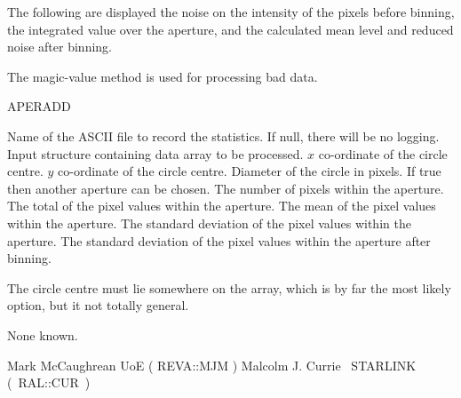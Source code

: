 {\begin{manroutinedescription}
  The following are displayed the noise on the intensity of the
  pixels before binning, the integrated value over the aperture, and
  the calculated mean level and reduced noise after binning.

  The magic-value method is used for processing bad data.

  APERADD

\begin{manparametertable}
  Name of the ASCII file to record the statistics. If null,
  there will be no logging. {\mantt [!]}
  Input {} structure containing data array to be processed.
  {$x$} co-ordinate of the circle centre.
  {$y$} co-ordinate of the circle centre.
  Diameter of the circle in pixels.
  If true then another aperture can be chosen.
  The number of pixels within the aperture.
  The total of the pixel values within the aperture.
  The mean of the pixel values within the aperture.
  The standard deviation of the pixel values within the aperture.
  The standard deviation of the pixel values within the aperture after
  binning.
\end{manparametertable}
  The circle centre must lie somewhere on the array, which is
  by far the most likely option, but it not totally general.

  None known.

  Mark McCaughrean UoE ( {\mantt REVA}::{\mantt MJM} )
  Malcolm J. Currie ~STARLINK \mbox{( {\mantt RAL}::{\mantt CUR} )}
\end{manroutinedescription}

 
}
